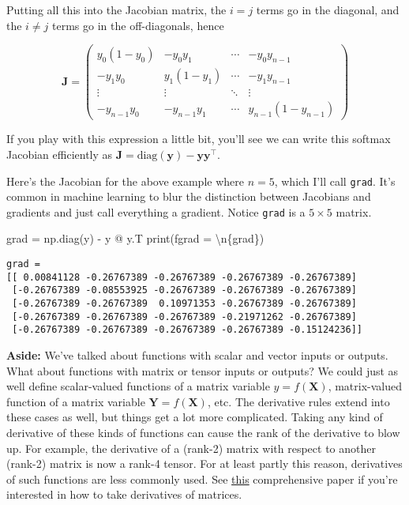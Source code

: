 \documentclass[
  letterpaper,
  DIV=11,
  numbers=noendperiod]{scrreprt}
\newenvironment{Shaded}{\begin{snugshade}}{\end{snugshade}}
\newcommand{\BuiltInTok}[1]{\textcolor[rgb]{0.00,0.23,0.31}{#1}}
\newcommand{\CharTok}[1]{\textcolor[rgb]{0.13,0.47,0.30}{#1}}
\newcommand{\NormalTok}[1]{\textcolor[rgb]{0.00,0.23,0.31}{#1}}
\newcommand{\OperatorTok}[1]{\textcolor[rgb]{0.37,0.37,0.37}{#1}}
\newcommand{\SpecialCharTok}[1]{\textcolor[rgb]{0.37,0.37,0.37}{#1}}
\newcommand{\SpecialStringTok}[1]{\textcolor[rgb]{0.13,0.47,0.30}{#1}}
\begin{document}
Putting all this into the Jacobian matrix, the \(i=j\) terms go in the
diagonal, and the \(i \neq j\) terms go in the off-diagonals, hence

\[
\mathbf{J} = 
\begin{pmatrix} 
y_0 (1 - y_0) & -y_0 y_1 & \cdots & -y_0 y_{n-1} \\ 
-y_1 y_0 & y_1 (1 - y_1) & \cdots & -y_1 y_{n-1} \\ 
\vdots & \vdots & \ddots & \vdots \\
-y_{n-1} y_0 & -y_{n-1} y_1 & \cdots & y_{n-1} (1 - y_{n-1})
\end{pmatrix}
\]

If you play with this expression a little bit, you'll see we can write
this softmax Jacobian efficiently as
\(\mathbf{J} = \text{diag}(\mathbf{y}) - \mathbf{y} \mathbf{y}^\top\).

Here's the Jacobian for the above example where \(n=5\), which I'll call
\texttt{grad}. It's common in machine learning to blur the distinction
between Jacobians and gradients and just call everything a gradient.
Notice \texttt{grad} is a \(5 \times 5\) matrix.

\begin{Shaded}
\begin{Highlighting}[]
\NormalTok{grad }\OperatorTok{=}\NormalTok{ np.diag(y) }\OperatorTok{{-}}\NormalTok{ y }\OperatorTok{@}\NormalTok{ y.T}
\BuiltInTok{print}\NormalTok{(}\SpecialStringTok{f\textquotesingle{}grad = }\CharTok{\textbackslash{}n}\SpecialCharTok{\{}\NormalTok{grad}\SpecialCharTok{\}}\SpecialStringTok{\textquotesingle{}}\NormalTok{)}
\end{Highlighting}
\end{Shaded}

\begin{verbatim}
grad = 
[[ 0.00841128 -0.26767389 -0.26767389 -0.26767389 -0.26767389]
 [-0.26767389 -0.08553925 -0.26767389 -0.26767389 -0.26767389]
 [-0.26767389 -0.26767389  0.10971353 -0.26767389 -0.26767389]
 [-0.26767389 -0.26767389 -0.26767389 -0.21971262 -0.26767389]
 [-0.26767389 -0.26767389 -0.26767389 -0.26767389 -0.15124236]]
\end{verbatim}

\textbf{Aside:} We've talked about functions with scalar and vector
inputs or outputs. What about functions with matrix or tensor inputs or
outputs? We could just as well define scalar-valued functions of a
matrix variable \(y = f(\mathbf{X})\), matrix-valued function of a
matrix variable \(\mathbf{Y} = f(\mathbf{X})\), etc. The derivative
rules extend into these cases as well, but things get a lot more
complicated. Taking any kind of derivative of these kinds of functions
can cause the rank of the derivative to blow up. For example, the
derivative of a (rank-2) matrix with respect to another (rank-2) matrix
is now a rank-4 tensor. For at least partly this reason, derivatives of
such functions are less commonly used. See
\href{https://www.math.uwaterloo.ca/~hwolkowi/matrixcookbook.pdf}{this}
comprehensive paper if you're interested in how to take derivatives of
matrices.
\end{document}

